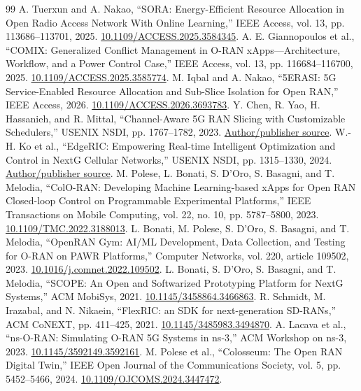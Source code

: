 \documentclass{IEEEoj}
\begin{document}
\begin{thebibliography}{99}
 A. Tuerxun and A. Nakao, ``SORA: Energy-Efficient Resource Allocation in Open Radio Access Network With Online Learning,'' IEEE Access, vol. 13, pp. 113686--113701, 2025. \href{https://doi.org/10.1109/ACCESS.2025.3584345}{10.1109/ACCESS.2025.3584345}.
 A. E. Giannopoulos et al., ``COMIX: Generalized Conflict Management in O-RAN xApps---Architecture, Workflow, and a Power Control Case,'' IEEE Access, vol. 13, pp. 116684--116700, 2025. \href{https://doi.org/10.1109/ACCESS.2025.3585774}{10.1109/ACCESS.2025.3585774}.
 M. Iqbal and A. Nakao, ``5ERASI: 5G Service-Enabled Resource Allocation and Sub-Slice Isolation for Open RAN,'' IEEE Access, 2026. \href{https://doi.org/10.1109/ACCESS.2026.3693783}{10.1109/ACCESS.2026.3693783}.
 Y. Chen, R. Yao, H. Hassanieh, and R. Mittal, ``Channel-Aware 5G RAN Slicing with Customizable Schedulers,'' USENIX NSDI, pp. 1767--1782, 2023. \href{https://www.usenix.org/conference/nsdi23/presentation/chen-yongzhou}{Author/publisher source}.
 W.-H. Ko et al., ``EdgeRIC: Empowering Real-time Intelligent Optimization and Control in NextG Cellular Networks,'' USENIX NSDI, pp. 1315--1330, 2024. \href{https://www.usenix.org/conference/nsdi24/presentation/ko}{Author/publisher source}.
 M. Polese, L. Bonati, S. D'Oro, S. Basagni, and T. Melodia, ``ColO-RAN: Developing Machine Learning-based xApps for Open RAN Closed-loop Control on Programmable Experimental Platforms,'' IEEE Transactions on Mobile Computing, vol. 22, no. 10, pp. 5787--5800, 2023. \href{https://doi.org/10.1109/TMC.2022.3188013}{10.1109/TMC.2022.3188013}.
 L. Bonati, M. Polese, S. D'Oro, S. Basagni, and T. Melodia, ``OpenRAN Gym: AI/ML Development, Data Collection, and Testing for O-RAN on PAWR Platforms,'' Computer Networks, vol. 220, article 109502, 2023. \href{https://doi.org/10.1016/j.comnet.2022.109502}{10.1016/j.comnet.2022.109502}.
 L. Bonati, S. D'Oro, S. Basagni, and T. Melodia, ``SCOPE: An Open and Softwarized Prototyping Platform for NextG Systems,'' ACM MobiSys, 2021. \href{https://doi.org/10.1145/3458864.3466863}{10.1145/3458864.3466863}.
 R. Schmidt, M. Irazabal, and N. Nikaein, ``FlexRIC: an SDK for next-generation SD-RANs,'' ACM CoNEXT, pp. 411--425, 2021. \href{https://doi.org/10.1145/3485983.3494870}{10.1145/3485983.3494870}.
 A. Lacava et al., ``ns-O-RAN: Simulating O-RAN 5G Systems in ns-3,'' ACM Workshop on ns-3, 2023. \href{https://doi.org/10.1145/3592149.3592161}{10.1145/3592149.3592161}.
 M. Polese et al., ``Colosseum: The Open RAN Digital Twin,'' IEEE Open Journal of the Communications Society, vol. 5, pp. 5452--5466, 2024. \href{https://doi.org/10.1109/OJCOMS.2024.3447472}{10.1109/OJCOMS.2024.3447472}.

\end{thebibliography}
\end{document}
